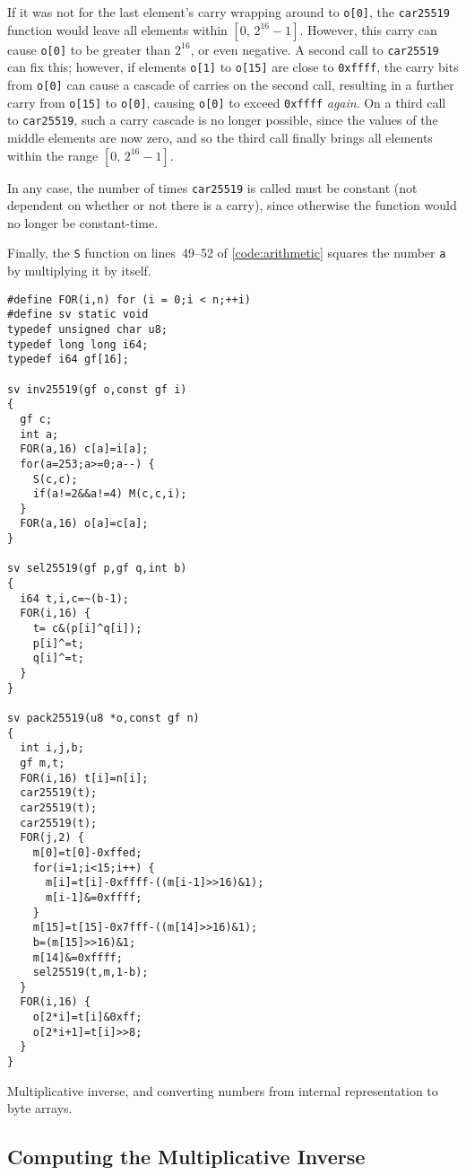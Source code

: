 \documentclass{article}
\begin{document}
If it was not for the last element's carry wrapping around to \verb|o[0]|, the \verb|car25519| function would leave all elements within $[0,\, 2^{16}-1]$.
However, this carry can cause \verb|o[0]| to be greater than $2^{16}$, or even negative.
A second call to \verb|car25519| can fix this; however, if elements \verb|o[1]| to \verb|o[15]| are close to \verb|0xffff|, the carry bits from \verb|o[0]| can cause a cascade of carries on the second call, resulting in a further carry from \verb|o[15]| to \verb|o[0]|, causing \verb|o[0]| to exceed \verb|0xffff| \emph{again}.
On a third call to \verb|car25519|, such a carry cascade is no longer possible, since the values of the middle elements are now zero, and so the third call finally brings all elements within the range $[0,\, 2^{16}-1]$.

In any case, the number of times \verb|car25519| is called must be constant (not dependent on whether or not there is a carry), since otherwise the function would no longer be constant-time.

Finally, the \verb|S| function on lines~49--52 of \autoref{code:arithmetic} squares the number \verb|a| by multiplying it by itself.

\begin{listing}
\begin{verbatim}
#define FOR(i,n) for (i = 0;i < n;++i)
#define sv static void
typedef unsigned char u8;
typedef long long i64;
typedef i64 gf[16];

sv inv25519(gf o,const gf i)
{
  gf c;
  int a;
  FOR(a,16) c[a]=i[a];
  for(a=253;a>=0;a--) {
    S(c,c);
    if(a!=2&&a!=4) M(c,c,i);
  }
  FOR(a,16) o[a]=c[a];
}

sv sel25519(gf p,gf q,int b)
{
  i64 t,i,c=~(b-1);
  FOR(i,16) {
    t= c&(p[i]^q[i]);
    p[i]^=t;
    q[i]^=t;
  }
}

sv pack25519(u8 *o,const gf n)
{
  int i,j,b;
  gf m,t;
  FOR(i,16) t[i]=n[i];
  car25519(t);
  car25519(t);
  car25519(t);
  FOR(j,2) {
    m[0]=t[0]-0xffed;
    for(i=1;i<15;i++) {
      m[i]=t[i]-0xffff-((m[i-1]>>16)&1);
      m[i-1]&=0xffff;
    }
    m[15]=t[15]-0x7fff-((m[14]>>16)&1);
    b=(m[15]>>16)&1;
    m[14]&=0xffff;
    sel25519(t,m,1-b);
  }
  FOR(i,16) {
    o[2*i]=t[i]&0xff;
    o[2*i+1]=t[i]>>8;
  }
}
\end{verbatim}
\caption{Multiplicative inverse, and converting numbers from internal representation to byte arrays.}\label{code:pack25519}
\end{listing}

\subsection{Computing the Multiplicative Inverse}\label{sec:inverse}
\end{document}
